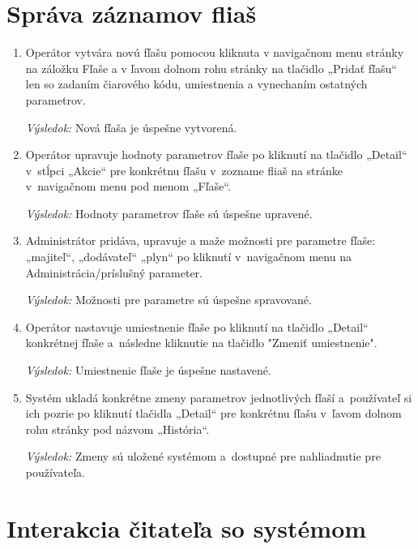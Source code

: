 \documentclass{zah}
\begin{document}
\section{Správa záznamov fliaš}

\begin{enumerate}
	\item Operátor vytvára novú fľašu pomocou kliknuta v navigačnom menu stránky na záložku Fľaše a v ľavom dolnom rohu stránky na tlačidlo „Pridať fľašu“ len so zadaním čiarového kódu, umiestnenia a vynechaním ostatných parametrov.
	
	\textit{Výsledok:} Nová fľaša je úspešne vytvorená.
	
	\item Operátor upravuje hodnoty parametrov fľaše po kliknutí na tlačidlo „Detail“ v stĺpci „Akcie“ pre konkrétnu fľašu v zozname fliaš na stránke v navigačnom menu pod menom „Fľaše“.
	
	\textit{Výsledok:} Hodnoty parametrov fľaše sú úspešne upravené.
	
	\item Administrátor pridáva, upravuje a maže možnosti pre parametre fľaše: „majiteľ“, „dodávateľ“  „plyn“  po kliknutí v navigačnom menu na Administrácia/príslušný parameter.
	
	\textit{Výsledok:} Možnosti pre parametre sú úspešne spravované.
	
	\item Operátor nastavuje umiestnenie fľaše po kliknutí na tlačidlo „Detail“ konkrétnej fľaše a následne kliknutie na tlačidlo "Zmeniť umiestnenie".
	
	\textit{Výsledok:} Umiestnenie fľaše je úspešne nastavené.
	
	\item Systém ukladá konkrétne zmeny parametrov jednotlivých fľaší a používateľ si ich pozrie po kliknutí tlačidla „Detail“ pre konkrétnu fľašu v ľavom dolnom rohu stránky pod názvom „História“.
	
	\textit{Výsledok:} Zmeny sú uložené systémom a dostupné pre nahliadnutie pre používateľa.
\end{enumerate}

\section{Interakcia čitateľa so systémom}
\end{document}
